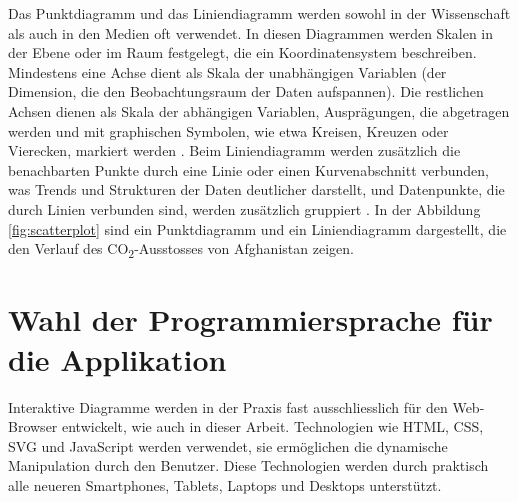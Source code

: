 Das Punktdiagramm und das Liniendiagramm werden sowohl in der Wissenschaft als auch in den Medien oft verwendet. In diesen Diagrammen werden Skalen in der Ebene oder im Raum festgelegt, die ein Koordinatensystem beschreiben. Mindestens eine Achse dient als Skala der unabhängigen Variablen (der Dimension, die den Beobachtungsraum der Daten aufspannen). Die restlichen Achsen dienen als Skala der abhängigen Variablen, Ausprägungen, die abgetragen werden und mit graphischen Symbolen, wie etwa Kreisen, Kreuzen oder Vierecken, markiert werden \cite[Kapitel 5.2]{viz}. Beim Liniendiagramm werden zusätzlich die benachbarten Punkte durch eine Linie oder einen Kurvenabschnitt verbunden, was Trends und Strukturen der Daten deutlicher darstellt, und Datenpunkte, die durch Linien verbunden sind, werden zusätzlich gruppiert \cite[Kapitel 5.2]{viz}. In der Abbildung \ref{fig:scatterplot} sind ein Punktdiagramm und ein Liniendiagramm dargestellt, die den Verlauf des CO\textsubscript{2}-Ausstosses von Afghanistan zeigen.

\section{Wahl der Programmiersprache für die Applikation}

Interaktive Diagramme werden in der Praxis fast ausschliesslich für den Web-Browser entwickelt, wie auch in dieser Arbeit. Technologien wie HTML, CSS, SVG und JavaScript werden verwendet, sie ermöglichen die dynamische Manipulation durch den Benutzer. Diese Technologien werden durch praktisch alle neueren Smartphones, Tablets, Laptops und Desktops unterstützt.

